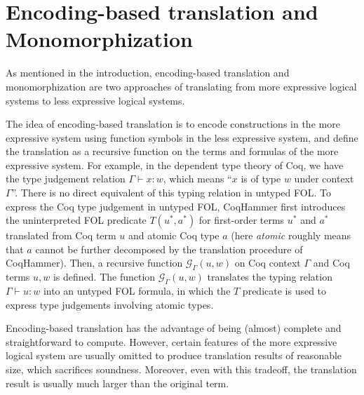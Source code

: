 \section{Encoding-based translation and Monomorphization}\label{subencmon}

  As mentioned in the introduction, encoding-based translation and monomorphization
  are two approaches of translating from more expressive logical systems to
  less expressive logical systems.

  The idea of encoding-based translation is to encode
  constructions in the more expressive system using function symbols in the less
  expressive system, and define the translation as a recursive function on the terms and formulas
  of the more expressive system. For example, in the dependent type theory of Coq,
  we have the type judgement relation $\Gamma \vdash x : w$, which means ``$x$ is of
  type $w$ under context $\Gamma$''. There is no direct equivalent of this
  typing relation in untyped FOL. To express the Coq type judgement in untyped FOL, 
  CoqHammer first introduces the uninterpreted FOL predicate $T(u^*, a^*)$ for
  first-order terms $u^*$ and $a^*$ translated from Coq term $u$ and atomic Coq type $a$
  (here \textit{atomic} roughly means that $a$ cannot be
  further decomposed by the translation procedure of CoqHammer). Then, a recursive function
  $\mathcal{G}_\Gamma(u, w)$ on Coq context $\Gamma$ and Coq terms $u, w$ is defined.
  The function $\mathcal{G}_\Gamma(u, w)$ translates the typing relation $\Gamma \vdash u : w$ into an untyped FOL formula,
  in which the $T$ predicate is used to express type judgements involving atomic types.
  
  Encoding-based translation has the advantage of being (almost) complete
  and straightforward to compute. However, certain features of the more expressive
  logical system are usually omitted to produce translation results of reasonable size,
  which sacrifices soundness. Moreover, even with this tradeoff, the translation result is usually much larger
  than the original term.

